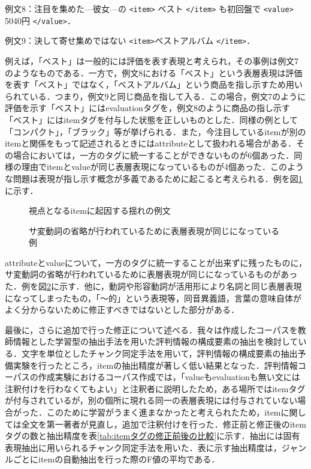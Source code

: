 \documentclass[japanese]{jnlp_1.4}
\begin{document}
例文8：注目を集めた—彼女—の \verb|<item>| ベスト \verb|</item>| も初回盤で \verb|<value>| 5040円 \verb|</value>|．

例文9：決して寄せ集めではない \verb|<item>|ベストアルバム \verb|</item>|．
\vspace*{0.5\baselineskip}

例えば，「ベスト」は一般的には評価を表す表現と考えられ，その事例は例文7のようなものである．一方で，例文8における「ベスト」という表層表現は評価を表す「ベスト」ではなく，「ベストアルバム」という商品を指し示すため用いられている．つまり，例文9と同じ商品を指して入る．この場合，例文7のように評価を示す「ベスト」にはevaluationタグを，例文8のように商品の指し示す「ベスト」にはitemタグを付与した状態を正しいものとした．同様の例として「コンパクト」，「ブラック」等が挙げられる．また，今注目しているitemが別のitemと関係をもって記述されるときにはattributeとして扱われる場合がある．その場合においては，一方のタグに統一することができないものが6個あった．同様の理由でitemとvalueが同じ表層表現になっているものが4個あった．このような問題は表現が指し示す概念が多義であるために起こると考えられる．例を図\ref{fig:視点となるitemに起因する揺れの例文}に示す．


\begin{figure}[b]

\caption{視点となるitemに起因する揺れの例文}
\label{fig:視点となるitemに起因する揺れの例文}
\end{figure}
\begin{figure}[b]

\caption{サ変動詞の省略が行われているために表層表現が同じになっている例}
\label{fig:サ変動詞の省略が行われているために表層表現が同じになっている例}
\end{figure}


attributeとvalueについて，一方のタグに統一することが出来ずに残ったものに，
サ変動詞の省略が行われているために表層表現が同じになっているものがあった．例を図\ref{fig:サ変動詞の省略が行われているために表層表現が同じになっている例}に示す．他に，動詞や形容動詞が活用形により名詞と同じ表層表現になってしまったもの，「〜的」という表現等，同音異義語，言葉の意味自体がよく分からないために修正すべきではないとした部分がある．

最後に，さらに追加で行った修正について述べる．我々は作成したコーパスを教師情報とした学習型の抽出手法を用いた評判情報の構成要素の抽出を検討している．文字を単位としたチャンク同定手法を用いて，評判情報の構成要素の抽出予備実験を行ったところ，itemの抽出精度が著しく低い結果となった．評判情報コーパスの作成実験におけるコーパス作成では，「valueもevaluationも無い文には注釈付けを行わなくてもよい」と注釈者に説明したため，ある場所ではitemタグが付与されているが，別の個所に現れる同一の表層表現には付与されていない場合がった．このために学習がうまく進まなかったと考えられたため，itemに関しては全文を第一著者が見直し，追加で注釈付けを行った．修正前と修正後のitemタグの数と抽出精度を表\ref{tab:itemタグの修正前後の比較}に示す．抽出には固有表現抽出に用いられるチャンク同定手法を用いた．表に示す抽出精度は，ジャンルごとにitemの自動抽出を行った際のF値の平均である．
\end{document}
